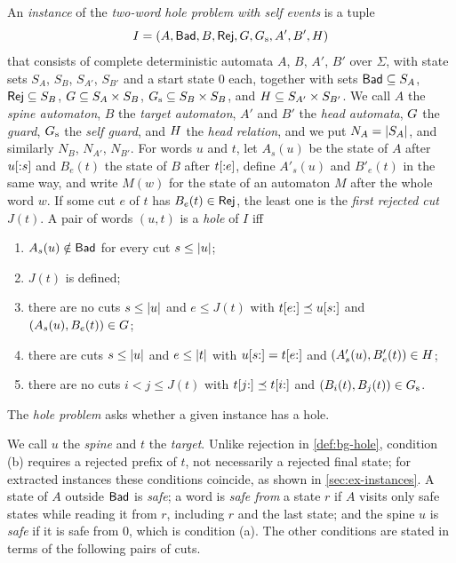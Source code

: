 \begin{definition}\label{def:ex-ss2self}\label{def:ex-ss2}
An \emph{instance} of the \emph{two-word hole problem with self events} is a
tuple
\[
 I=(A,\mathsf{Bad},B,\mathsf{Rej},G,G_{\mathrm{s}},A',B',H)
\]
that consists of complete deterministic automata $A$, $B$, $A'$, $B'$ over $\Sigma$, with state sets
$S_A$, $S_B$, $S_{A'}$, $S_{B'}$ and a start state $0$ each, together with
sets $\mathsf{Bad}\subseteq S_A$, $\mathsf{Rej}\subseteq S_B$, $G\subseteq S_A\times S_B$,
$G_{\mathrm{s}}\subseteq S_B\times S_B$, and $H\subseteq S_{A'}\times S_{B'}$.
We call $A$ the \emph{spine automaton}, $B$ the \emph{target automaton}, $A'$
and $B'$ the \emph{head automata}, $G$ the \emph{guard}, $G_{\mathrm{s}}$ the
\emph{self guard}, and $H$ the \emph{head relation}, and we put
$N_A=\lvert S_A\rvert$, and similarly $N_B$, $N_{A'}$, $N_{B'}$. For words $u$ and
$t$, let $A_s(u)$ be the state of $A$ after $u[{:}s]$ and $B_e(t)$ the state
of $B$ after $t[{:}e]$, define $A'_s(u)$ and $B'_e(t)$ in the same way, and
write $M(w)$ for the state of an automaton $M$ after the whole word $w$. If
some cut $e$ of $t$ has $B_e(t)\in\mathsf{Rej}$, the least one is the \emph{first
rejected cut} $J(t)$. A pair of words $(u,t)$ is a \emph{hole} of $I$ iff
\begin{enumerate}[label=(\alph*),leftmargin=*]
\item $A_s(u)\notin\mathsf{Bad}$ for every cut $s\le\lvert u\rvert$;
\item $J(t)$ is defined;
\item there are no cuts $s\le\lvert u\rvert$ and $e\le J(t)$ with
  $t[e{:}]\preceq u[s{:}]$ and $(A_s(u),B_e(t))\in G$;
\item there are cuts $s\le\lvert u\rvert$ and $e\le\lvert t\rvert$ with $u[s{:}]=t[e{:}]$
  and $(A'_s(u),B'_e(t))\in H$;
\item there are no cuts $i<j\le J(t)$ with $t[j{:}]\preceq t[i{:}]$ and
  $(B_i(t),B_j(t))\in G_{\mathrm{s}}$.
\end{enumerate}
The \emph{hole problem} asks whether a given instance has a hole.
\end{definition}

We call $u$ the \emph{spine} and $t$ the \emph{target}. Unlike rejection in
\cref{def:bg-hole}, condition (b) requires a rejected prefix of $t$, not
necessarily a rejected final state; for extracted instances these conditions
coincide, as shown in \cref{sec:ex-instances}. A state of $A$ outside
$\mathsf{Bad}$ is \emph{safe}; a word is \emph{safe from} a state $r$ if $A$ visits
only safe states while reading it from $r$, including $r$ and the last state;
and the spine $u$ is \emph{safe} if it is safe from $0$, which is condition
(a). The other conditions are stated in terms of the following pairs of cuts.


